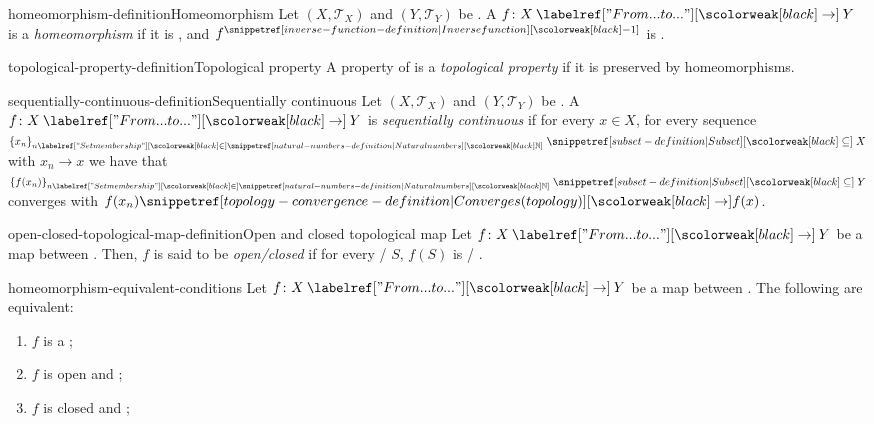 \documentclass[preview]{standalone}
\begin{document}
\begin{snippetdefinition}{homeomorphism-definition}{Homeomorphism}
    Let \((X, {\mathcal{T}}_X)\) and \((Y, {\mathcal{T}}_Y)\) be .
    A \function \(f\colon X \fromto Y\) is a \textit{homeomorphism} if it is \topologycontinuous, \bijective
    and \(f^\inversefunction\) is \topologycontinuous.
\end{snippetdefinition}

\begin{snippetdefinition}{topological-property-definition}{Topological property}
    A property of 
    is a \emph{topological property} if it is preserved by homeomorphisms.
\end{snippetdefinition}


\begin{snippetdefinition}{sequentially-continuous-definition}{Sequentially continuous}
    Let \((X, {\mathcal{T}}_X)\) and \((Y, {\mathcal{T}}_Y)\) be .
    A \function \(f\colon X \fromto Y\) is \textit{sequentially continuous} if for every
    \(x\in X\), for every sequence \({\{x_n\}}_{n \in \naturalnumbers} \subseteq X\) with \(x_n \to x\)
    we have that \({\{f(x_n)\}}_{n \in \naturalnumbers} \subseteq Y\) converges with
    \(f(x_n) \topologyconverges f(x)\).
\end{snippetdefinition}

\begin{snippetdefinition}{open-closed-topological-map-definition}{Open and closed topological map}
    Let \(f \colon X \fromto Y\)
    be a map between .
    Then, \(f\) is said to be \emph{open/closed}
    if for every  / \closedset \(S\),
    \(f(S)\) is \topologicalspace[open][Open] / \closedset[closed].
\end{snippetdefinition}

\begin{snippetproposition}{homeomorphism-equivalent-conditions}{}
    Let \(f \colon X \fromto Y\)
    be a map between .
    The following are equivalent:
    \begin{enumerate}
        \item \(f\) is a \homeomorphism;
        \item \(f\) is open and \bijective;
        \item \(f\) is closed and \bijective;
    \end{enumerate}
\end{snippetproposition}
\end{document}
